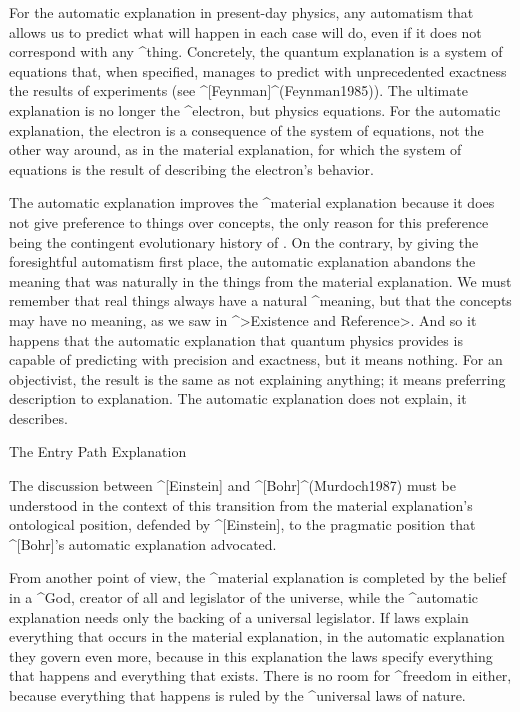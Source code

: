 For the automatic explanation in present-day physics, any automatism
that allows us to predict what will happen in each case will do, even if
it does not correspond with any ^{thing}. Concretely, the quantum
explanation is a system of equations that, when specified, manages to
predict with unprecedented exactness the results of experiments (see
^[Feynman]^(Feynman1985)). The ultimate explanation is no longer the
^{electron}, but physics equations. For the automatic explanation, the
electron is a consequence of the system of equations, not the other way
around, as in the material explanation, for which the system of
equations is the result of describing the electron's behavior.

The automatic explanation improves the ^{material explanation} because
it does not give preference to things over concepts, the only reason for
this preference being the contingent evolutionary history of . On the contrary, by giving the foresightful automatism first
place, the automatic explanation abandons the meaning that was naturally
in the things from the material explanation. We must remember that real
things always have a natural ^{meaning}, but that the concepts may have
no meaning, as we saw in ^>Existence and Reference>. And so it happens
that the automatic explanation that quantum physics provides is capable
of predicting with precision and exactness, but it means nothing. For an
objectivist, the result is the same as not explaining anything; it means
preferring description to explanation. The automatic explanation does
not explain, it describes.


\Section The Entry Path Explanation

The discussion between ^[Einstein] and ^[Bohr]^(Murdoch1987) must be
understood in the context of this transition from the material
explanation's ontological position, defended by ^[Einstein], to the
pragmatic position that ^[Bohr]'s automatic explanation advocated.

From another point of view, the ^{material explanation} is completed by
the belief in a ^{God}, creator of all and legislator of the universe,
while the ^{automatic explanation} needs only the backing of a universal
legislator. If laws explain everything that occurs in the material
explanation, in the automatic explanation they govern even more, because
in this explanation the laws specify everything that happens and
everything that exists. There is no room for ^{freedom} in either,
because everything that happens is ruled by the ^{universal laws} of
nature.

